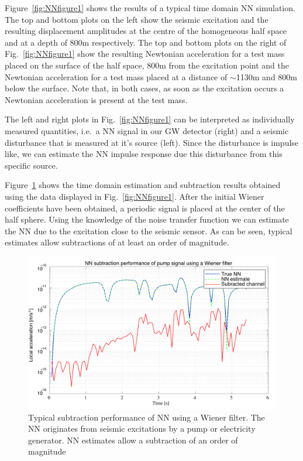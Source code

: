 Figure~\ref{fig:NNfigure1} shows the results of a typical time domain NN simulation. The top and bottom plots on the left show the seismic excitation and the resulting displacement amplitudes at the centre of the homogeneous half space and at a depth of 800m respectively. The top and bottom plots on the right of Fig.~\ref{fig:NNfigure1} show the resulting Newtonian acceleration for a test mass placed on the surface of the half space, 800m from the excitation point and the Newtonian acceleration for a test mass placed at a distance of $\sim$1130m and 800m below the surface. Note that, in both cases, as soon as the excitation occurs a Newtonian acceleration is present at the test mass. 

The left and right plots in Fig.~\ref{fig:NNfigure1} can be interpreted as individually measured quantities, i.e.\ a NN signal in our GW detector (right) and a seismic disturbance that is measured at it's source (left). Since the disturbance is impulse like, we can estimate the NN impulse response due this disturbance from this specific source. 

Figure~\ref{fig:NNfigure2} shows the time domain estimation and subtraction results obtained using the data displayed in Fig.~\ref{fig:NNfigure1}. After the initial Wiener coefficients have been obtained, a periodic signal is placed at the center of the half sphere. Using the knowledge of the noise transfer function we can estimate the NN due to the excitation close to the seismic sensor. As can be seen, typical estimates allow subtractions of at least an order of magnitude.   
\begin{figure}[t!]
	\begin{center}
		\includegraphics[width=16.5cm]{./Sec_SiteInfra/Figures/nnsubtraction.pdf}
		\caption{Typical subtraction performance of NN using a Wiener filter. The NN originates from seismic excitations by a pump or electricity generator. NN estimates allow a subtraction of an order of magnitude }
		\label{fig:NNfigure2}
	\end{center}
\end{figure}

